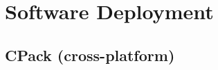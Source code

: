 \chapter{Software Deployment}
\label{sec:deployment-software}


\section{CPack (cross-platform)}
\label{sec:cpack}


